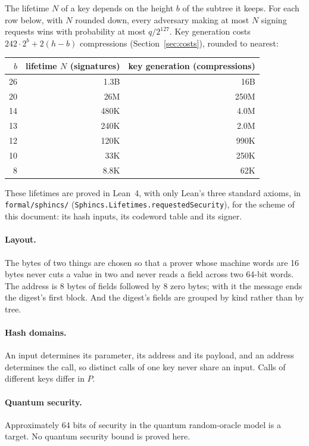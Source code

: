 \documentclass[11pt]{article}
\theoremstyle{plain}
\theoremstyle{definition}
\begin{document}
The lifetime $N$ of a key depends on the height $b$ of the subtree it keeps. For each row below, with $N$ rounded down, every adversary making at most $N$ signing requests wins with probability at most $q/2^{127}$. Key generation costs $242\cdot2^b+2(h-b)$ compressions (Section~\ref{sec:costs}), rounded to nearest:
\begin{center}
\begin{tabular}{@{}rrr@{}}
\toprule
$b$ & lifetime $N$ (signatures) & key generation (compressions)\\
\midrule
26 & 1.3B & 16B\\
20 & 26M & 250M\\
14 & 480K & 4.0M\\
13 & 240K & 2.0M\\
12 & 120K & 990K\\
10 & 33K & 250K\\
8 & 8.8K & 62K\\
\bottomrule
\end{tabular}
\end{center}
These lifetimes are proved in Lean~4, with only Lean's three standard axioms, in \texttt{formal/sphincs/} (\texttt{Sphincs.Lifetimes.requestedSecurity}), for the scheme of this document: its hash inputs, its codeword table and its signer.

\paragraph{Layout.}
\label{sec:layout}
The bytes of two things are chosen so that a prover whose machine words are 16 bytes never cuts a value in two and never reads a field across two 64-bit words. The address is 8 bytes of fields followed by 8 zero bytes; with it the message ends the digest's first block. And the digest's fields are grouped by kind rather than by tree.

\paragraph{Hash domains.}
An input determines its parameter, its address and its payload, and an address determines the call, so distinct calls of one key never share an input. Calls of different keys differ in $P$.

\paragraph{Quantum security.}
\label{sec:quantum}
Approximately 64 bits of security in the quantum random-oracle model is a target. No quantum security bound is proved here.
\end{document}
